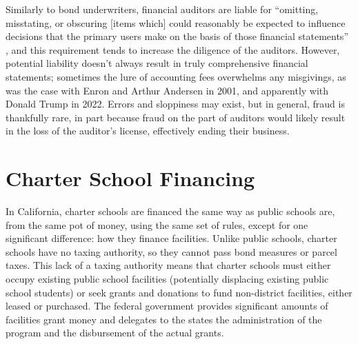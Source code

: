 Similarly to bond underwriters, financial auditors are liable for ``omitting, misstating, or obscuring [items which] could reasonably be expected to influence decisions that the primary users make on the basis of those financial statements'' \parencite{Cayamanda2020}, and this requirement tends to increase the diligence of the auditors. However, potential liability doesn't always result in truly comprehensive financial statements; sometimes the lure of accounting fees overwhelms any misgivings, as was the case with Enron and Arthur Andersen in 2001, and apparently with Donald Trump in 2022. Errors and sloppiness may exist, but in general, fraud is thankfully rare, in part because fraud on the part of auditors would likely result in the loss of the auditor's license, effectively ending their business. 


\section{Charter School Financing}\label{sec:charter-school-financing}\indent

In California, charter schools are financed the same way as public schools are, from the same pot of money, using the same set of rules, except for one significant difference: how they finance facilities. Unlike public schools, charter schools have no taxing authority, so they cannot pass bond measures or parcel taxes. This lack of a taxing authority means that charter schools must either occupy existing public school facilities (potentially displacing existing public school students) or seek grants and donations to fund non-district facilities, either leased or purchased. The federal government provides significant amounts of facilities grant money and delegates to the states the administration of the program and the disbursement of the actual grants. 

